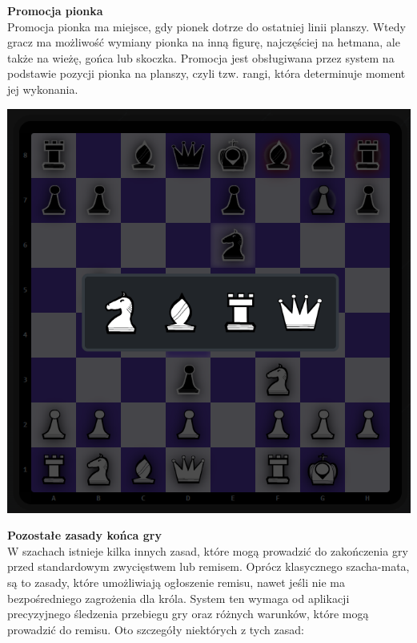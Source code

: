 \documentclass[12pt,a4paper]{article}
\begin{document}
\begin{minipage}[t]{0.6\textwidth} 
    \vspace{0pt} 
    \justifying 
    \noindent 
    \textbf{Promocja pionka}\\
    Promocja pionka ma miejsce, gdy pionek dotrze do ostatniej linii planszy. Wtedy gracz ma możliwość wymiany pionka na inną figurę, najczęściej na hetmana, ale także na wieżę, gońca lub skoczka. Promocja jest obsługiwana przez system na podstawie pozycji pionka na planszy, czyli tzw. rangi, która determinuje moment jej wykonania.
\end{minipage} 
\hfill 
\begin{minipage}[t]{0.3\textwidth} 
    \vspace{0pt} 
    \centering 
    \includegraphics[width=\linewidth]{images/imp_front_promotion.png} 
\end{minipage}

\newpage

\noindent \textbf{Pozostałe zasady końca gry}\\
W szachach istnieje kilka innych zasad, które mogą prowadzić do zakończenia gry przed standardowym zwycięstwem lub remisem. Oprócz klasycznego szacha-mata, są to zasady, które umożliwiają ogłoszenie remisu, nawet jeśli nie ma bezpośredniego zagrożenia dla króla. System ten wymaga od aplikacji precyzyjnego śledzenia przebiegu gry oraz różnych warunków, które mogą prowadzić do remisu. Oto szczegóły niektórych z tych zasad:
\end{document}
